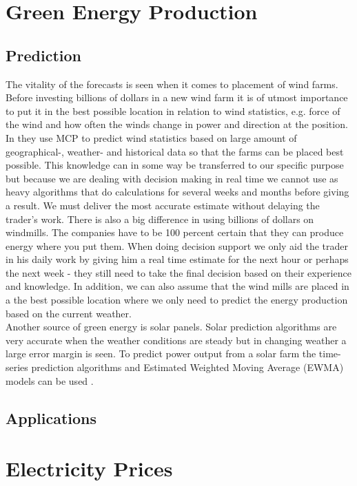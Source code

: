 \documentclass[twoside,11pt,openright]{report}
\begin{document}
\section{Green Energy Production}
\subsection{Prediction}

The vitality of the forecasts is seen when it comes to
placement of wind farms. Before investing billions of dollars in a new wind farm it is of utmost importance to put it in the best possible location in relation to wind statistics, e.g. force of the wind and how often the winds change in power and direction at the position. In \cite{4} they use MCP to predict wind statistics based on large amount of geographical-, weather- and historical data so that the farms can be placed best possible. This knowledge can in some way be transferred to our specific purpose but because we are dealing with decision making in real time we cannot use as heavy algorithms that do calculations for several weeks and months before giving a result. We must deliver the most accurate estimate without delaying the trader's work.
There is also a big difference in using billions of dollars on windmills. The companies have to be 100 percent certain that they can produce energy where you put them. When doing decision support we only aid the trader in his daily work by giving him a real time estimate for the next hour or perhaps the next week - they still need to take the final decision based on their experience and knowledge. In addition, we can also assume that the wind mills are placed in a the best possible location where we only need to predict the energy production based on the current weather.
\\[0.5cm]
Another source of green energy is solar panels. Solar
prediction algorithms are very accurate when the weather conditions are steady but in changing weather a large error margin is seen. To predict power output from a solar farm the time-series prediction algorithms and Estimated Weighted Moving Average (EWMA) models can be used \cite{5}.

\subsection{Applications}


\section{Electricity Prices}
\end{document}
